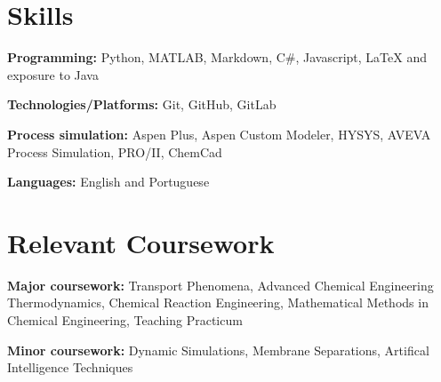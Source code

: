 \documentclass[letterpaper,11pt]{article}
\newcommand{\resumeSubHeadingListStart}{\begin{itemize}[leftmargin=0.15in, label={}]}
\newcommand{\resumeSubHeadingListEnd}{\end{itemize}}
\begin{document}

\section{Skills}
  \vspace{2pt}
  \resumeSubHeadingListStart
    \small{\item{
        \textbf{Programming:}{ Python, MATLAB, Markdown, C\#, Javascript, LaTeX and exposure to Java} \\ \vspace{3pt}
        
        \textbf{Technologies/Platforms:}{ Git, GitHub, GitLab} \\ \vspace{3pt}

        \textbf{Process simulation:}{ Aspen Plus, Aspen Custom Modeler, HYSYS, AVEVA Process Simulation, PRO/II, ChemCad} \\ \vspace{3pt}
        
        \textbf{Languages:}{ English and Portuguese}
        
    }}
  \resumeSubHeadingListEnd


\section{Relevant Coursework}
  \vspace{2pt}
  \resumeSubHeadingListStart
    \small{\item{
        \textbf{Major coursework:}{ Transport Phenomena, Advanced Chemical Engineering Thermodynamics, Chemical Reaction Engineering,
         Mathematical Methods in Chemical Engineering, Teaching Practicum} \\ \vspace{3pt}
        
        \textbf{Minor coursework:}{ Dynamic Simulations, Membrane Separations, Artifical Intelligence Techniques }
    }}
  \resumeSubHeadingListEnd
  
\end{document}
